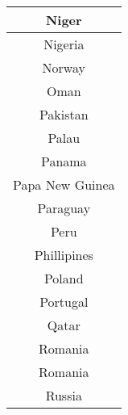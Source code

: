 \documentclass{article}
\begin{document}
\begin{center}
\begin{tabular} {|| c ||}
Niger\\ \hline 
Nigeria\\ \hline 
Norway\\ \hline 
Oman\\ \hline 
Pakistan\\ \hline 
Palau\\ \hline 
Panama\\ \hline 
Papa New Guinea\\ \hline 
Paraguay\\ \hline 
Peru\\ \hline 
Phillipines\\ \hline 
Poland\\ \hline 
Portugal\\ \hline 
Qatar\\ \hline 
Romania\\ \hline 
Romania\\ \hline 
Russia\\ \hline 

    \end{tabular}
    \end{center}
    
\end{document}
